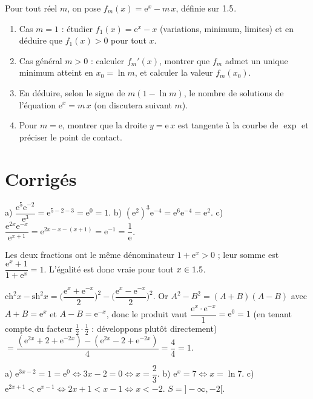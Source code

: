Pour tout réel $m$, on pose $f_m(x)=\mathrm{e}^{x}-m\,x$, définie sur $1.5$.
\begin{enumerate}[label=\arabic*)]
\item Cas $m=1$ : étudier $f_1(x)=\mathrm{e}^{x}-x$ (variations, minimum, limites) et en déduire
que $f_1(x)>0$ pour tout $x$.
\item Cas général $m>0$ : calculer $f_m'(x)$, montrer que $f_m$ admet un unique minimum atteint
en $x_0=\ln m$, et calculer la valeur $f_m(x_0)$.
\item En déduire, selon le signe de $m(1-\ln m)$, le nombre de solutions de l'équation
$\mathrm{e}^{x}=m\,x$ (on discutera suivant $m$).
\item Pour $m=\mathrm{e}$, montrer que la droite $y=\mathrm{e}\,x$ est tangente à la courbe de
$\exp$ et préciser le point de contact.
\end{enumerate}

\section{Corrigés}

a) $\dfrac{\mathrm{e}^{5}\mathrm{e}^{-2}}{\mathrm{e}^{3}}=\mathrm{e}^{5-2-3}=\mathrm{e}^{0}=1$. \quad
b) $(\mathrm{e}^{2})^{3}\mathrm{e}^{-4}=\mathrm{e}^{6}\mathrm{e}^{-4}=\mathrm{e}^{2}$. \quad
c) $\dfrac{\mathrm{e}^{2x}\mathrm{e}^{-x}}{\mathrm{e}^{x+1}}=\mathrm{e}^{2x-x-(x+1)}=\mathrm{e}^{-1}
=\dfrac1{\mathrm{e}}$.

Les deux fractions ont le même dénominateur $1+\mathrm{e}^{x}>0$ ; leur somme est
$\dfrac{\mathrm{e}^{x}+1}{1+\mathrm{e}^{x}}=1$. L'égalité est donc vraie pour tout $x\in1.5$.

$\mathrm{ch}^{2}x-\mathrm{sh}^{2}x
=\Big(\dfrac{\mathrm{e}^{x}+\mathrm{e}^{-x}}{2}\Big)^{2}-\Big(\dfrac{\mathrm{e}^{x}-\mathrm{e}^{-x}}{2}\Big)^{2}$.
Or $A^{2}-B^{2}=(A+B)(A-B)$ avec $A+B=\mathrm{e}^{x}$ et $A-B=\mathrm{e}^{-x}$, donc le produit
vaut $\dfrac{\mathrm{e}^{x}\cdot\mathrm{e}^{-x}}{1}=\mathrm{e}^{0}=1$ (en tenant compte du facteur
$\tfrac12\cdot\tfrac12$ : développons plutôt directement)
$=\dfrac{(\mathrm{e}^{2x}+2+\mathrm{e}^{-2x})-(\mathrm{e}^{2x}-2+\mathrm{e}^{-2x})}{4}
=\dfrac{4}{4}=1$.

a) $\mathrm{e}^{3x-2}=1=\mathrm{e}^{0}\iff 3x-2=0\iff x=\dfrac23$. \quad
b) $\mathrm{e}^{x}=7\iff x=\ln 7$. \quad
c) $\mathrm{e}^{2x+1}<\mathrm{e}^{x-1}\iff 2x+1<x-1\iff x<-2$. \;$S=]-\infty,-2[$.

